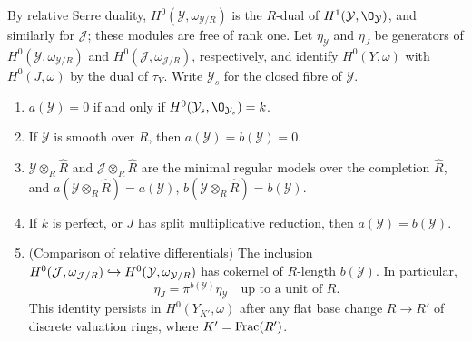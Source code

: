 By relative Serre duality, $H^0(\mathcal Y,\omega_{\mathcal Y/R})$ is the $R$-dual of $H^1(\mathcal Y,\O_{\mathcal Y})$, and similarly for $\mathcal J$; these modules are free of rank one.
Let $\eta_{\mathcal Y}$ and $\eta_J$ be generators of $H^0(\mathcal Y,\omega_{\mathcal Y/R})$ and $H^0(\mathcal J,\omega_{\mathcal J/R})$, respectively, and identify $H^0(Y,\omega)$ with $H^0(J,\omega)$ by the dual of $\tau_Y$.
Write $\mathcal Y_s$ for the closed fibre of $\mathcal Y$.

\begin{lemma}\label{lem:ab-properties}
\begin{enumerate}
\item $a(\mathcal Y) = 0$ if and only if $H^0(\mathcal Y_s,\O_{\mathcal Y_s}) = k$.
\item If $\mathcal Y$ is smooth over $R$, then $a(\mathcal Y) = b(\mathcal Y) = 0$.
\item $\mathcal Y\otimes_R\widehat R$ and $\mathcal J\otimes_R\widehat R$ are the minimal regular models over the completion $\widehat R$, and $a(\mathcal Y\otimes_R\widehat R) = a(\mathcal Y)$, $b(\mathcal Y\otimes_R\widehat R) = b(\mathcal Y)$.
\item If $k$ is perfect, or $J$ has split multiplicative reduction, then $a(\mathcal Y) = b(\mathcal Y)$.
\item \textup{(Comparison of relative differentials)}
  The inclusion $H^0(\mathcal J,\omega_{\mathcal J/R})\hookrightarrow H^0(\mathcal Y,\omega_{\mathcal Y/R})$ has cokernel of $R$-length $b(\mathcal Y)$.
  In particular,
  \begin{equation}\label{eq:hodge}
    \eta_J = \pi^{b(\mathcal Y)}\eta_{\mathcal Y}\quad\text{up to a unit of } R.
  \end{equation}
  This identity persists in $H^0(Y_{K'},\omega)$ after any flat base change $R\to R'$ of discrete valuation rings, where $K' = \operatorname{Frac}(R')$.
\end{enumerate}
\end{lemma}

